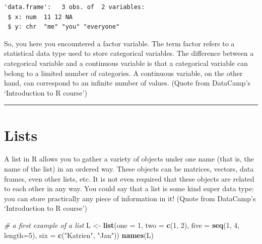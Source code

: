 \documentclass[
]{book}
\newenvironment{Shaded}{\begin{snugshade}}{\end{snugshade}}
\newcommand{\CommentTok}[1]{\textcolor[rgb]{0.56,0.35,0.01}{\textit{#1}}}
\newcommand{\DataTypeTok}[1]{\textcolor[rgb]{0.13,0.29,0.53}{#1}}
\newcommand{\DecValTok}[1]{\textcolor[rgb]{0.00,0.00,0.81}{#1}}
\newcommand{\KeywordTok}[1]{\textcolor[rgb]{0.13,0.29,0.53}{\textbf{#1}}}
\newcommand{\NormalTok}[1]{#1}
\newcommand{\OperatorTok}[1]{\textcolor[rgb]{0.81,0.36,0.00}{\textbf{#1}}}
\newcommand{\StringTok}[1]{\textcolor[rgb]{0.31,0.60,0.02}{#1}}
\begin{document}
\begin{Shaded}
\end{Shaded}

\begin{verbatim}
'data.frame':	3 obs. of  2 variables:
 $ x: num  11 12 NA
 $ y: chr  "me" "you" "everyone"
\end{verbatim}

So, you here you encountered a factor variable. The term factor refers to a statistical data type used to store categorical variables. The difference between a categorical variable and a continuous variable is that a categorical variable can belong to a limited number of categories. A continuous variable, on the other hand, can correspond to an infinite number of values. (Quote from DataCamp's `Introduction to R course')

\begin{center}\rule{0.5\linewidth}{0.5pt}\end{center}

\hypertarget{lists}{%
\section{Lists}\label{lists}}

A list in R allows you to gather a variety of objects under one name (that is, the name of the list) in an ordered way. These objects can be matrices, vectors, data frames, even other lists, etc. It is not even required that these objects are related to each other in any way. You could say that a list is some kind super data type: you can store practically any piece of information in it! (Quote from DataCamp's `Introduction to R course')

\begin{Shaded}
\begin{Highlighting}[]
\CommentTok{# a first example of a list}
\NormalTok{L <-}\StringTok{ }\KeywordTok{list}\NormalTok{(}\DataTypeTok{one =} \DecValTok{1}\NormalTok{, }\DataTypeTok{two =} \KeywordTok{c}\NormalTok{(}\DecValTok{1}\NormalTok{, }\DecValTok{2}\NormalTok{), }\DataTypeTok{five =} \KeywordTok{seq}\NormalTok{(}\DecValTok{1}\NormalTok{, }\DecValTok{4}\NormalTok{, }\DataTypeTok{length=}\DecValTok{5}\NormalTok{),}
          \DataTypeTok{six =} \KeywordTok{c}\NormalTok{(}\StringTok{"Katrien"}\NormalTok{, }\StringTok{"Jan"}\NormalTok{))}
\KeywordTok{names}\NormalTok{(L)}
\end{Highlighting}
\end{Shaded}
\end{document}
